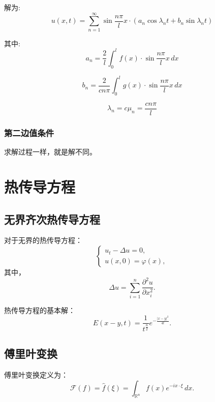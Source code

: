 \documentclass[12pt,a4paper]{article}
\numberwithin{subsection}{section}   %
\numberwithin{subsubsection}{subsection}
\theoremstyle{plain}
\theoremstyle{definition}
\theoremstyle{remark}
\theoremstyle{remark}
\begin{document}
	解为:
	\begin{equation}
		u(x, t) = \sum_{n=1}^{\infty} \sin \frac{n\pi}{l} x \cdot \left( a_n \cos \lambda_n t + b_n \sin \lambda_n t \right)
	\end{equation}
	
	其中:
	\begin{equation}
		a_n = \frac{2}{l} \int_0^l f(x) \cdot \sin \frac{n\pi}{l} x \, dx
	\end{equation}
	
	\begin{equation}
		b_n = \frac{2}{c n \pi} \int_0^l g(x) \cdot \sin \frac{n\pi}{l} x \, dx
	\end{equation}
	
	\begin{equation}
		\lambda_n = c \mu_n = \frac{c n \pi}{l}
	\end{equation}
	
		\subsubsection{第二边值条件}
求解过程一样，就是解不同。
	
	\section{热传导方程}
	\subsection{无界齐次热传导方程}
	对于无界的热传导方程：
	\begin{equation}
		\begin{cases}\label{wujierechuandao}
			u_t - \Delta u = 0, \\
			u(x, 0) = \varphi(x),
		\end{cases}
	\end{equation}
	其中，
	\begin{equation}
		\Delta u = \sum_{i=1}^n \frac{\partial^2 u}{\partial x_i^2}.
	\end{equation}
	
	热传导方程的基本解：
	\begin{equation}
		E(x - y, t) = \frac{1}{t^{\frac{n}{2}}} e^{-\frac{|x - y|^2}{4t}}.
	\end{equation}
	
	\subsection{傅里叶变换}
	傅里叶变换定义为：
	\begin{equation}
		\mathcal{F}(f) = \hat{f}(\xi) = \int_{\mathbb{R}^n} f(x) e^{-i x \cdot \xi} \, dx.
	\end{equation}
	
\end{document}

